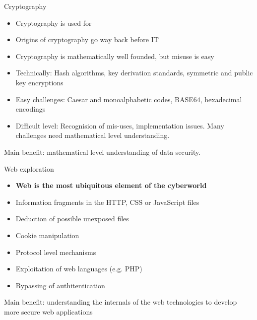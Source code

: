 \documentclass[12 pt]{beamer}
\begin{document}

\begin{frame}{Cryptography}

  \begin{itemize}
    \item{Cryptography is used for }
    \item{Origins of cryptography go way back before IT}
    \item{Cryptography is mathematically well founded, but misuse is easy}
    \item{Technically: Hash algorithms, key derivation standards, symmetric and public key encryptions}
    \item{Easy challenges: Caesar and monoalphabetic codes, BASE64, hexadecimal encodings}
    \item{Difficult level: Recognision of mis-uses, implementation issues. Many challenges need mathematical level understanding.}
  \end{itemize}

  \begin{exampleblock}{}
    Main benefit: mathematical level understanding of data security.
  \end{exampleblock}

\end{frame}


\begin{frame}{Web exploration}

  \begin{itemize}
    \item{\textbf{Web is the most ubiquitous element of the cyberworld}}
    \item{Information fragments in the HTTP, CSS or JavaScript files}
    \item{Deduction of possible unexposed files}
    \item{Cookie manipulation}
    \item{Protocol level mechanisms}
    \item{Exploitation of web languages (e.g. PHP)}
    \item{Bypassing of authitentication}
  \end{itemize}

  \begin{exampleblock}{}
    Main benefit: understanding the internals of the web technologies to develop more secure web applications
  \end{exampleblock}
\end{frame}
\end{document}
